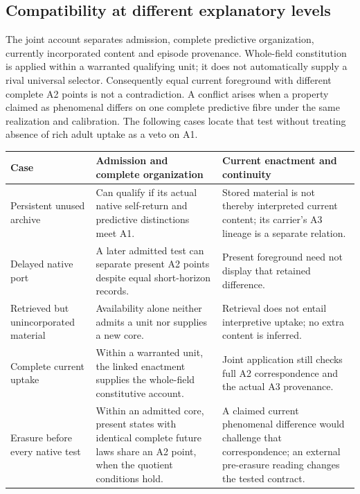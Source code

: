 \subsection{Compatibility at different explanatory levels}
\label{sec:constitutive-case-ledger}
The joint account separates admission, complete predictive organization, currently incorporated content and episode provenance. Whole-field constitution is applied within a warranted qualifying unit; it does not automatically supply a rival universal selector. Consequently equal current foreground with different complete A2 points is not a contradiction. A conflict arises when a property claimed as phenomenal differs on one complete predictive fibre under the same realization and calibration. The following cases locate that test without treating absence of rich adult uptake as a veto on A1.

\begin{center}\small
\begin{tabularx}{\textwidth}{@{}>{\raggedright\arraybackslash}p{}YY@{}}
\toprule Case & Admission and complete organization & Current enactment and continuity\\\midrule
Persistent unused archive & Can qualify if its actual native self-return and predictive distinctions meet A1. & Stored material is not thereby interpreted current content; its carrier's A3 lineage is a separate relation.\\
Delayed native port & A later admitted test can separate present A2 points despite equal short-horizon records. & Present foreground need not display that retained difference.\\
Retrieved but unincorporated material & Availability alone neither admits a unit nor supplies a new core. & Retrieval does not entail interpretive uptake; no extra content is inferred.\\
Complete current uptake & Within a warranted unit, the linked enactment supplies the whole-field constitutive account. & Joint application still checks full A2 correspondence and the actual A3 provenance.\\
Erasure before every native test & Within an admitted core, present states with identical complete future laws share an A2 point, when the quotient conditions hold. & A claimed current phenomenal difference would challenge that correspondence; an external pre-erasure reading changes the tested contract.\\\bottomrule
\end{tabularx}
\end{center}

